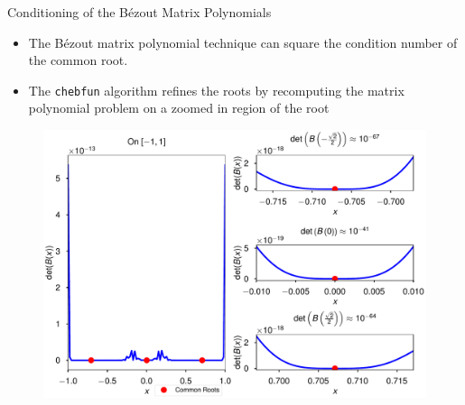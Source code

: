 \documentclass[xcolor={rgb,dvipsnames}]{beamer}		%
\begin{document}

\begin{frame}{Conditioning of the B\'{e}zout Matrix Polynomials}
\begin{itemize}
\item The B\'{e}zout matrix polynomial technique can square the condition number of the common root.
\item The {\tt chebfun} algorithm refines the roots by recomputing the matrix polynomial problem on a zoomed in region of the root
\end{itemize}


\begin{center}
\begin{figure}
\includegraphics[height=.63\textheight]{bezout_det_plot.pdf}
\end{figure}
\end{center}
\end{frame}
\end{document}
